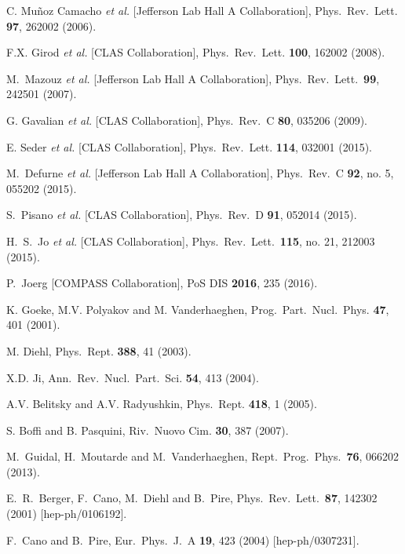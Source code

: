 \documentclass[twocolumn,nofootinbib,showpacs,prl,superscriptaddress,secnumarabic,amssymb,nobibnotes,aps,floatfix]{revtex4}
\begin{document}
\begin{thebibliography}{99}
C. Mu\~noz Camacho {\it et al.} [Jefferson Lab Hall A Collaboration],
Phys.\ Rev.\ Lett. {\bf 97}, 262002 (2006).

F.X. Girod {\it et al.} [CLAS Collaboration],
Phys.\ Rev.\ Lett. {\bf 100}, 162002 (2008).

   M.~Mazouz {\it et al.} [Jefferson Lab Hall A Collaboration],
   Phys.\ Rev.\ Lett.\  {\bf 99}, 242501 (2007).

G. Gavalian {\it et al.} [CLAS Collaboration],
Phys.\ Rev.\ C {\bf 80}, 035206 (2009).

E. Seder {\it et al.} [CLAS Collaboration],
Phys.\ Rev.\ Lett. {\bf 114}, 032001 (2015).

  M.~Defurne {\it et al.} [Jefferson Lab Hall A Collaboration],
  Phys.\ Rev.\ C {\bf 92}, no. 5, 055202 (2015).

S.~Pisano {\it et al.} [CLAS Collaboration],
Phys.\ Rev.\ D {\bf 91}, 052014 (2015).

H.~S.~Jo {\it et al.} [CLAS Collaboration],
  Phys.\ Rev.\ Lett.\  {\bf 115}, no. 21, 212003 (2015).

  P.~Joerg [COMPASS Collaboration],
  PoS DIS {\bf 2016}, 235 (2016).

K. Goeke, M.V. Polyakov and M. Vanderhaeghen,
Prog.\ Part.\ Nucl.\ Phys. {\bf 47}, 401 (2001).

M. Diehl,
Phys.\ Rept.  {\bf 388}, 41 (2003).

X.D. Ji,
Ann.\ Rev.\ Nucl.\ Part.\ Sci. {\bf 54}, 413 (2004).

A.V. Belitsky and A.V. Radyushkin,
Phys.\ Rept. {\bf 418}, 1 (2005).

 S. Boffi and B. Pasquini,
Riv.\ Nuovo Cim. {\bf 30}, 387 (2007).

M.~Guidal, H.~Moutarde and M.~Vanderhaeghen,
Rept.\ Prog.\ Phys.\  {\bf 76}, 066202 (2013).

  E.~R.~Berger, F.~Cano, M.~Diehl and B.~Pire,
  Phys.\ Rev.\ Lett.\  {\bf 87}, 142302 (2001)
  [hep-ph/0106192].

  F.~Cano and B.~Pire,
  Eur.\ Phys.\ J.\ A {\bf 19}, 423 (2004)
  [hep-ph/0307231].


\end{thebibliography}
\end{document}
